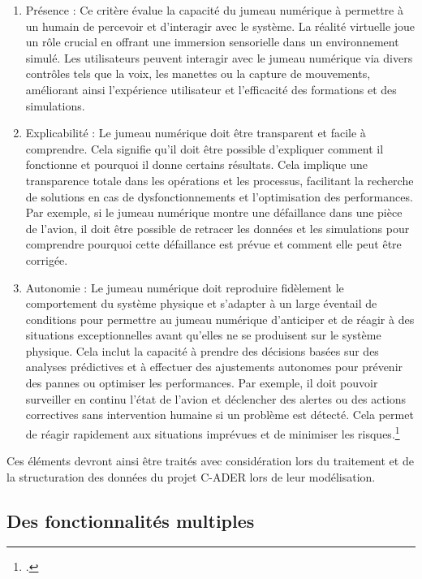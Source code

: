 \begin{enumerate}
    \item Présence : Ce critère évalue la capacité du jumeau numérique à permettre à un humain de percevoir et d'interagir avec le système. La réalité virtuelle joue un rôle crucial en offrant une immersion sensorielle dans un environnement simulé. Les utilisateurs peuvent interagir avec le jumeau numérique via divers contrôles tels que la voix, les manettes ou la capture de mouvements, améliorant ainsi l'expérience utilisateur et l'efficacité des formations et des simulations.\\
    \item Explicabilité : Le jumeau numérique doit être transparent et facile à comprendre. Cela signifie qu'il doit être possible d'expliquer comment il fonctionne et pourquoi il donne certains résultats. Cela implique une transparence totale dans les opérations et les processus, facilitant la recherche de solutions en cas de dysfonctionnements et l'optimisation des performances. Par exemple, si le jumeau numérique montre une défaillance dans une pièce de l’avion, il doit être possible de retracer les données et les simulations pour comprendre pourquoi cette défaillance est prévue et comment elle peut être corrigée.\\
    \item Autonomie : Le jumeau numérique doit reproduire fidèlement le comportement du système physique et s'adapter à un large éventail de conditions pour permettre au jumeau numérique d'anticiper et de réagir à des situations exceptionnelles avant qu'elles ne se produisent sur le système physique. Cela inclut la capacité à prendre des décisions basées sur des analyses prédictives et à effectuer des ajustements autonomes pour prévenir des pannes ou optimiser les performances. Par exemple, il doit pouvoir surveiller en continu l’état de l’avion et déclencher des alertes ou des actions correctives sans intervention humaine si un problème est détecté. Cela permet de réagir rapidement aux situations imprévues et de minimiser les risques.\footcite{bealJumeauNumeriqueRealite}
\end{enumerate}

Ces éléments devront ainsi être traités avec considération lors du traitement et de la structuration des données du projet C-ADER lors de leur modélisation.

        \subsection{Des fonctionnalités multiples}

